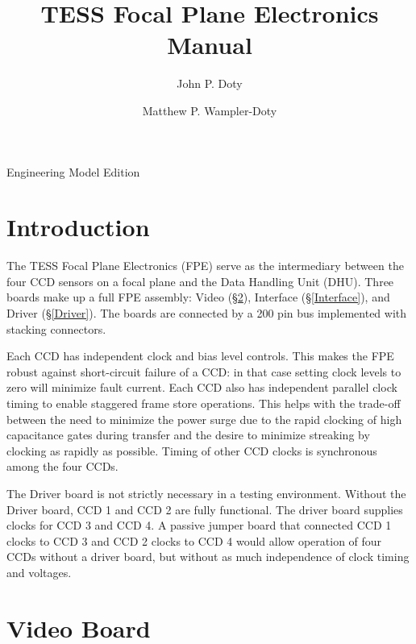 \documentclass[12pt]{article}
\author{
John P. Doty \and Matthew P. Wampler-Doty
}
\title{TESS Focal Plane Electronics Manual}
\date{}
\let\oldsection\section
\renewcommand{\section}{\FloatBarrier\oldsection}
\begin{document}
\begin{titlepage}
\maketitle
\begin{center}
Engineering Model Edition


% 
\end{center}
\end{titlepage} 

\tableofcontents

\listoffigures

\listoftables
\pagebreak

\section{Introduction}
The TESS Focal Plane Electronics (FPE) serve as the intermediary between the four CCD sensors on a focal plane and the Data Handling Unit (DHU). Three boards make up a full FPE assembly: Video (\S \ref{Video}), Interface (\S  \ref{Interface}), and Driver (\S \ref{Driver}). The boards are connected by a 200 pin bus implemented with stacking connectors. 

Each CCD has independent clock and bias level controls. This makes the FPE robust against short-circuit failure of a CCD: in that case setting clock levels to zero will minimize fault current. Each CCD also has independent parallel clock timing to enable staggered frame store operations. This helps with the trade-off between the need to minimize the power surge due to the rapid clocking of high capacitance gates during transfer and the desire to minimize streaking by clocking as rapidly as possible. Timing of other CCD clocks is synchronous among the four CCDs.

The Driver board is not strictly necessary in a testing environment. Without the Driver board, CCD 1 and CCD 2 are fully functional. The driver board supplies clocks for CCD 3 and CCD 4. A passive jumper board that connected CCD 1 clocks to CCD 3 and CCD 2 clocks to CCD 4 would allow operation of four CCDs without a driver board, but without as much independence of clock timing and voltages.

\section{Video Board}
\label{Video}
\end{document}
